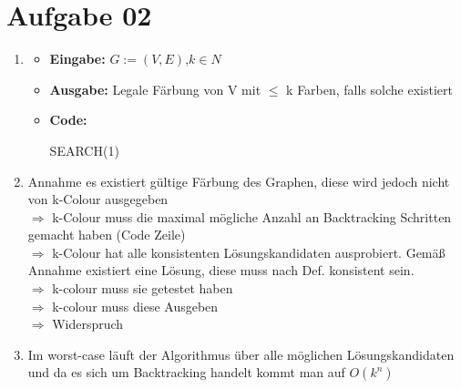 \documentclass[10pt,a4paper]{article}
\begin{document}
\section*{Aufgabe 02}
    \begin{enumerate}[label={\alph*)}]
        
        \item
            \begin{itemize}
                \item \textbf{Eingabe:} $G:=(V,E)$,$ k \in N$
                \item \textbf{Ausgabe:} 
                    Legale Färbung von V mit $\leq$ k Farben, falls solche existiert
                \item \textbf{Code: } \\
                \begin{algorithm}[H]
                    SEARCH(1) \;
                     {
                    }
                \end{algorithm}

            \end{itemize}

        
        \item
                Annahme es existiert gültige Färbung des Graphen, diese wird jedoch nicht von k-Colour ausgegeben
                    \\$\Rightarrow$ k-Colour muss die maximal mögliche Anzahl an Backtracking Schritten gemacht haben (Code Zeile)
                    \\$\Rightarrow$ k-Colour hat alle konsistenten Lösungskandidaten ausprobiert.
                    Gemäß Annahme existiert eine Lösung, diese muss nach Def. konsistent sein.
                    \\$\Rightarrow$ k-colour muss sie getestet haben
                    \\$\Rightarrow$ k-colour muss diese Ausgeben 
                    \\$\Rightarrow$ Widerspruch
        
        \item Im worst-case läuft der Algorithmus über alle möglichen 
                    Lösungskandidaten und da es sich um Backtracking handelt 
                    kommt man auf $O(k^n)$
        
    \end{enumerate}
\end{document}
